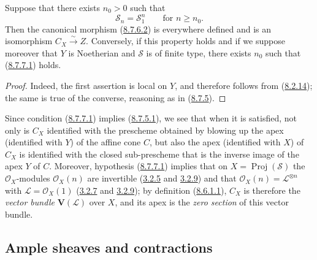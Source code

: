 \begin{corollary}[8.7.7]
\label{II.8.7.7}
Suppose that there exists $n_0>0$ such that
\begin{equation}
\label{II.8.7.7.1}
  \mathcal{S}_n=\mathcal{S}_1^n
  \qquad\text{for }n\geqslant n_0.
\tag{8.7.7.1}
\end{equation}
Then the canonical morphism (\hyperref[II.8.7.6.2]{8.7.6.2}) is everywhere
defined and is an isomorphism $C_X\xrightarrow{\sim}Z$. Conversely, if this
property holds and if we suppose moreover that $Y$ is Noetherian and
$\mathcal{S}$ is of finite type, there exists $n_0$ such that
(\hyperref[II.8.7.7.1]{8.7.7.1}) holds.
\end{corollary}

\begin{proof}
Indeed, the first assertion is local on $Y$, and therefore follows from
(\hyperref[II.8.2.14]{8.2.14}); the same is true of the converse,
reasoning as in (\hyperref[II.8.7.5]{8.7.5}).
\end{proof}

\begin{remark}[8.7.8]
\label{II.8.7.8}
Since condition (\hyperref[II.8.7.7.1]{8.7.7.1}) implies
(\hyperref[II.8.7.5.1]{8.7.5.1}), we see that when it is satisfied, not
only is $C_X$ identified with the prescheme obtained by blowing up the apex
(identified with $Y$) of the affine cone $C$, but also the apex (identified
with $X$) of $C_X$ is identified with the closed sub-prescheme that is the
inverse image of the apex $Y$ of $C$. Moreover, hypothesis
(\hyperref[II.8.7.7.1]{8.7.7.1}) implies that on
$X=\operatorname{Proj}(\mathcal{S})$ the $\mathcal{O}_X$-modules
$\mathcal{O}_X(n)$ are invertible (\hyperref[II.3.2.5]{3.2.5} and
\hyperref[II.3.2.9]{3.2.9}) and that
$\mathcal{O}_X(n)=\mathcal{L}^{\otimes n}$ with
$\mathcal{L}=\mathcal{O}_X(1)$ (\hyperref[II.3.2.7]{3.2.7} and
\hyperref[II.3.2.9]{3.2.9}); by definition
(\hyperref[II.8.6.1.1]{8.6.1.1}), $C_X$ is therefore the \emph{vector
bundle} $\mathbf{V}(\mathcal{L})$ over $X$, and its apex is the \emph{zero
section} of this vector bundle.
\end{remark}

\subsection{Ample sheaves and contractions}
\label{subsection:II.8.8}

